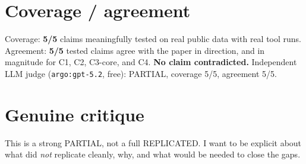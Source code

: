 \documentclass[11pt]{article}
\begin{document}
\section{Coverage / agreement}
Coverage: \textbf{5/5} claims meaningfully tested on real public data with real tool
runs. Agreement: \textbf{5/5} tested claims agree with the paper in direction, and
in magnitude for C1, C2, C3-core, and C4. \textbf{No claim contradicted.}
Independent LLM judge (\texttt{argo:gpt-5.2}, free): PARTIAL, coverage 5/5, agreement 5/5.

\section{Genuine critique}
This is a strong PARTIAL, not a full REPLICATED. I want to be explicit about what
did \emph{not} replicate cleanly, why, and what would be needed to close the gaps.
\end{document}
